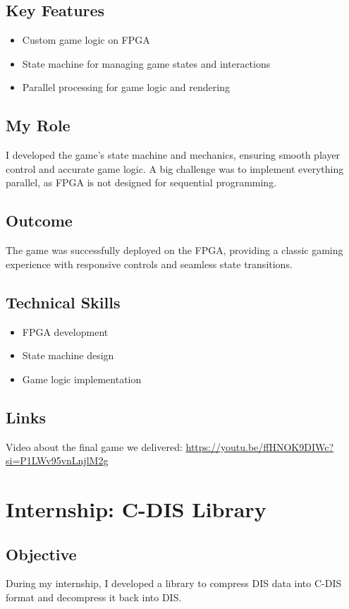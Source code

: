 \documentclass{article}
\begin{document}
\subsection{Key Features}
\begin{itemize}
    \item Custom game logic on FPGA
    \item State machine for managing game states and interactions
    \item Parallel processing for game logic and rendering
\end{itemize}

\subsection{My Role}
I developed the game's state machine and mechanics, ensuring smooth player control and accurate game logic.
A big challenge was to implement everything parallel, as FPGA is not designed for sequential programming.

\subsection{Outcome}
The game was successfully deployed on the FPGA, providing a classic gaming experience with responsive controls and seamless state transitions.

\subsection{Technical Skills}
\begin{itemize}
    \item FPGA development
    \item State machine design
    \item Game logic implementation
\end{itemize}

\subsection{Links}
Video about the final game we delivered:
\url{https://youtu.be/ffHNOK9DIWc?si=P1LWv95vnLnjlM2g}



\section{Internship: C-DIS Library}
\subsection{Objective}
During my internship, I developed a library to compress DIS data into C-DIS format and decompress it back into DIS.
\end{document}
